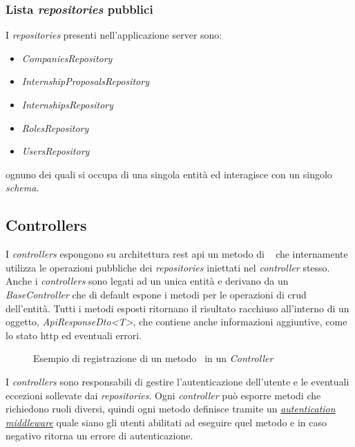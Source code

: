 \subsubsection{Lista \textit{repositories} pubblici}
I \textit{repositories} presenti nell'applicazione server sono:
\begin{itemize}[itemsep=0pt]
	\item \textit{CompaniesRepository}
	\item \textit{InternshipProposalsRepository}
	\item \textit{InternshipsRepository}
	\item \textit{RolesRepository}
	\item \textit{UsersRepository}
\end{itemize}
ognuno dei quali si occupa di una singola entità ed interagisce con un singolo \textit{schema}. 
\pagebreak
\subsection{Controllers}
\label{server:controllers}
I \textit{controllers} espongono su architettura \acrshort{rest} \acrshort{api} un metodo di \expressjs~ che internamente utilizza le operazioni pubbliche dei \textit{repositories} iniettati nel \textit{controller} stesso. Anche i \textit{controllers} sono legati ad un unica entità e derivano da un \textit{BaseController} che di default espone i metodi per le operazioni di \acrshort{crud} dell'entità. 
Tutti i metodi esposti ritornano il risultato racchiuso all'interno di un oggetto, \textit{ApiResponseDto<T>}, che contiene anche informazioni aggiuntive, come lo stato \acrshort{http} ed eventuali errori.

\begin{figure}[H] 
	\centering    
	
	\caption[Esempio di registrazione di un metodo \expressjs~in un \textit{Controller}]{Esempio di registrazione di un metodo \expressjs~in un \textit{Controller}}
	\label{fig:server-controller-1}
\end{figure}
\noindent
I \textit{controllers} sono responsabili di gestire l'autenticazione dell'utente e le eventuali eccezioni sollevate dai \textit{repositories}. Ogni \textit{controller} può esporre metodi che richiedono ruoli diversi, quindi ogni metodo definisce tramite un \textit{\hyperref[chap:auth-backend]{autentication middleware}} quale siano gli utenti abilitati ad eseguire quel metodo e in caso negativo ritorna un errore di autenticazione.

